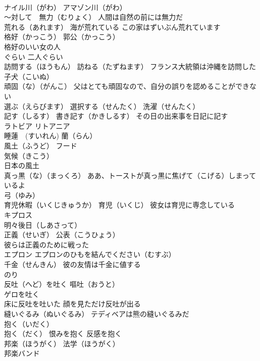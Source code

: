 \documentclass[8pt]{extreport}
\begin{document}
\begin{CJK}{UTF8}{min}
\\	ナイル川（がわ） アマゾン川（がわ）
\\	～対して　無力（むりょく） 人間は自然の前には無力だ
\\	荒れる（あれます） 海が荒れている この家はずいぶん荒れています
\\	格好（かっこう） 郭公（かっこう）
\\	格好のいい女の人
\\	ぐらい 二人ぐらい
\\	訪問する（ほうもん） 訪ねる（たずねます） フランス大統領は沖縄を訪問した
\\	子犬（こいぬ）
\\	頑固（な）（がんこ） 父はとても頑固なので、自分の誤りを認めることができない
\\	選ぶ（えらびます） 選択する（せんたく） 洗濯（せんたく） 
\\	記す（しるす） 書き記す（かきしるす） その日の出来事を日記に記す
\\	ラトビア リトアニア
\\	睡蓮　(すいれん) 蘭（らん）
\\	風土（ふうど） フード 
\\	気候（きこう） 
\\	日本の風土
\\	真っ黒（な）（まっくろ） ああ、トーストが真っ黒に焦げて（こげる）しまっているよ
\\	弓（ゆみ） 
\\	育児休暇（いくじきゅうか） 育児（いくじ） 彼女は育児に専念している
\\	キプロス
\\	明々後日（しあさって）
\\	正義（せいぎ） 公表（こうひょう）
\\	彼らは正義のために戦った
\\	エプロン エプロンのひもを結んでください（むすぶ）
\\	千金（せんきん） 彼の友情は千金に値する
\\	のり
\\	反吐（へど）を吐く 嘔吐（おうと）
\\	ゲロを吐く 
\\	床に反吐を吐いた 顔を見ただけ反吐が出る
\\	縫いぐるみ（ぬいぐるみ） テディベアは熊の縫いぐるみだ
\\	抱く（いだく） 
\\	抱く（だく） 恨みを抱く 反感を抱く
\\	邦楽（ほうがく） 法学（ほうがく）
\\	邦楽バンド

\end{CJK}
\end{document}
